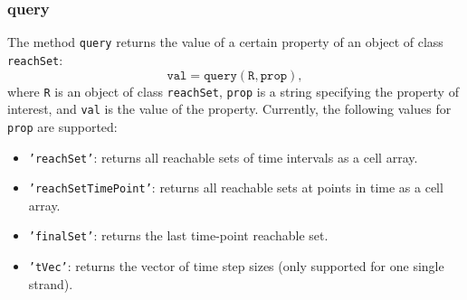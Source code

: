 \subsubsection{query}

The method \texttt{query} returns the value of a certain property of an object of class \texttt{reachSet}:
\begin{equation*}
	\texttt{val} = \texttt{query}(\texttt{R},\texttt{prop}),
\end{equation*}
where \texttt{R} is an object of class \texttt{reachSet}, \texttt{prop} is a string specifying the property of interest, and \texttt{val} is the value of the property. Currently, the following values for \texttt{prop} are supported:
\begin{itemize}
	\item \texttt{'reachSet'}: returns all reachable sets of time intervals as a cell array.
	\item \texttt{'reachSetTimePoint'}: returns all reachable sets at points in time as a cell array.
	\item \texttt{'finalSet'}: returns the last time-point reachable set.
	\item \texttt{'tVec'}: returns the vector of time step sizes (only supported for one single strand).
\end{itemize}
